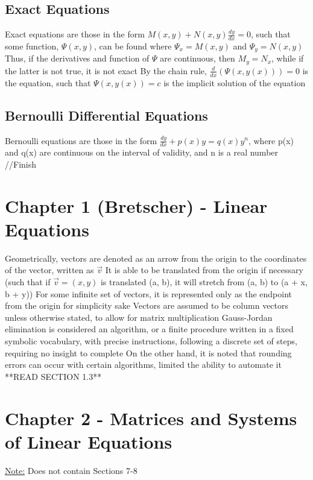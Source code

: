 \documentclass[11 pt, twoside]{article}
\newenvironment{outline*}
{
	\begin{outline}[enumerate]
	}
	{\end{outline}
}
\begin{document}
\subsection{Exact Equations}
\begin{outline*}
\1 Exact equations are those in the form $M(x, y) + N(x, y)\frac{dy}{dx} = 0$, such that some function, $\Psi (x, y)$,  can be found where $\Psi_x = M(x, y)$ and $\Psi_y = N(x, y)$
\2 Thus, if the derivatives and function of $\Psi$ are continuous, then $M_y = N_x$, while if the latter is not true, it is not exact
\2 By the chain rule, $\frac{d}{dx}(\Psi (x, y(x))) = 0$ is the equation, such that $\Psi (x, y(x)) = c$ is the implicit solution of the equation
\end{outline*}
\subsection{Bernoulli Differential Equations}
\begin{outline*}
\1 Bernoulli equations are those in the form $\frac{dy}{dx} + p(x)y = q(x)y^n$, where p(x) and q(x) are continuous on the interval of validity, and n is a real number
\1 //Finish
\end{outline*}



\section{Chapter 1 (Bretscher) - Linear Equations}
\begin{outline*}
\1 Geometrically, vectors are denoted as an arrow from the origin to the coordinates of the vector, written as $\vec{v}$
\2 It is able to be translated from the origin if necessary (such that if $\vec{v} = (x, y)$ is translated (a, b), it will stretch from (a, b) to (a + x, b + y))
\2 For some infinite set of vectors, it is represented only as the endpoint from the origin for simplicity sake
\2 Vectors are assumed to be column vectors unless otherwise stated, to allow for matrix multiplication
\1 Gauss-Jordan elimination is considered an algorithm, or a finite procedure written in a fixed symbolic vocabulary, with precise instructions, following a discrete set of steps, requiring no insight to complete
\2 On the other hand, it is noted that rounding errors can occur with certain algorithms, limited the ability to automate it
\1 **READ SECTION 1.3**
\end{outline*}
\section{Chapter 2 - Matrices and Systems of Linear Equations}
\underline{Note:} Does not contain Sections 7-8
\end{document}
